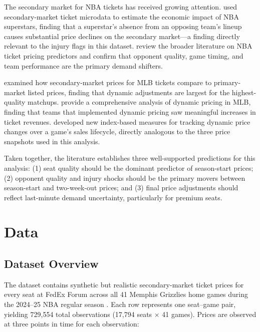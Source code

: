 \documentclass[12pt]{article}
\begin{document}
The secondary market for NBA tickets has received growing attention. \citet{kaplan2019economic} used secondary-market ticket microdata to estimate the economic impact of NBA superstars, finding that a superstar's absence from an opposing team's lineup causes substantial price declines on the secondary market---a finding directly relevant to the injury flags in this dataset. \citet{wanghan2023variables} review the broader literature on NBA ticket pricing predictors and confirm that opponent quality, game timing, and team performance are the primary demand shifters.
 
\citet{shapiro2012newage} examined how secondary-market prices for MLB tickets compare to primary-market listed prices, finding that dynamic adjustments are largest for the highest-quality matchups. \citet{courty2020variable} provide a comprehensive analysis of dynamic pricing in MLB, finding that teams that implemented dynamic pricing saw meaningful increases in ticket revenues. \citet{patel2018indices} developed new index-based measures for tracking dynamic price changes over a game's sales lifecycle, directly analogous to the three price snapshots used in this analysis.
 
Taken together, the literature establishes three well-supported predictions for this analysis: (1) seat quality should be the dominant predictor of season-start prices; (2) opponent quality and injury shocks should be the primary movers between season-start and two-week-out prices; and (3) final price adjustments should reflect last-minute demand uncertainty, particularly for premium seats.
 
 
\section{Data}
\label{sec:data}
 
\subsection{Dataset Overview}
 
The dataset contains synthetic but realistic secondary-market ticket prices for every seat at FedEx Forum across all 41 Memphis Grizzlies home games during the 2024--25 NBA regular season \citep{nba2025official}. Each row represents one seat--game pair, yielding 729,554 total observations (17,794 seats $\times$ 41 games). Prices are observed at three points in time for each observation:
 
\end{document}
